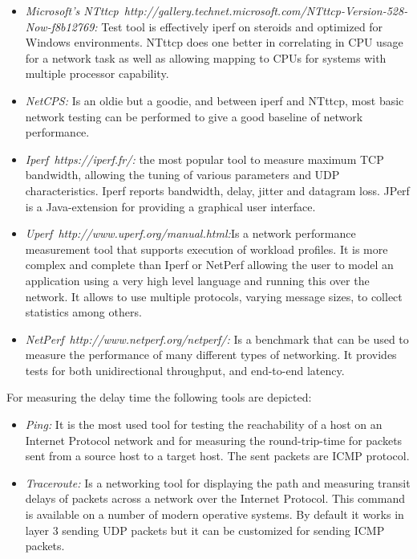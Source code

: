 \begin{itemize}
\item \emph{Microsoft's NTttcp~{http://gallery.technet.microsoft.com/NTttcp-Version-528-Now-f8b12769}:} Test tool is effectively iperf on steroids and
  optimized for Windows environments. NTttcp does one better in correlating in
  CPU usage for a network task as well as allowing mapping to CPUs for systems
  with multiple processor capability. 
\item \emph{NetCPS:} Is an oldie but a goodie, and between iperf and NTttcp,
  most basic network testing can be performed to give a good baseline of network
  performance.
\item \emph{Iperf~{https://iperf.fr/}:} the most popular tool to measure maximum TCP bandwidth, allowing the
  tuning of various parameters and UDP characteristics. Iperf reports
  bandwidth, delay, jitter and datagram loss. JPerf is a Java-extension for
  providing a graphical user interface.
\item \emph{Uperf~{http://www.uperf.org/manual.html}:}Is a network
  performance measurement tool that supports execution of workload profiles. It
  is more complex and complete than Iperf or NetPerf allowing the user to model
  an application using a very high level language and running this over the
  network. It allows to use multiple protocols, varying message sizes, to
  collect statistics among others.
\item \emph{NetPerf~{http://www.netperf.org/netperf/}:} Is a benchmark that can be used to measure the performance of many different types of networking. It provides tests for both unidirectional throughput, and end-to-end latency.
\end{itemize}

For measuring the delay time the following tools are depicted:
\begin{itemize}
\item \emph{Ping:} It is the most used tool for testing the reachability of a host on an
  Internet Protocol network and for measuring the round-trip-time for packets sent
  from a source host to a target host. The sent packets are \ac{ICMP} protocol.
\item \emph{Traceroute:} Is a networking tool for displaying the path and
  measuring transit delays of packets across a network over the Internet
  Protocol. This command is available on a number of modern operative systems. By
  default it works in layer 3 sending \ac{UDP} packets but it can be customized
  for sending \ac{ICMP} packets.
\end{itemize}

